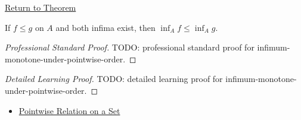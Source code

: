 \newpage
{}
\label{prf:infimum-monotone-under-pointwise-order}

\begin{remark*}[Return]
\hyperref[thm:infimum-monotone-under-pointwise-order]{Return to Theorem}
\end{remark*}

\begin{theorem*}
If \(f\leq g\) on \(A\) and both infima exist, then \(\inf_A f\leq\inf_A g\).
\end{theorem*}

\begin{proof}[Professional Standard Proof]
\LRAProofBodyStart
TODO: professional standard proof for infimum-monotone-under-pointwise-order.
\end{proof}

\begin{proof}[Detailed Learning Proof]
\LRAProofBodyStart
TODO: detailed learning proof for infimum-monotone-under-pointwise-order.
\end{proof}

\begin{remark*}
\end{remark*}

\begin{dependencies}
\begin{itemize}
  \item \hyperref[def:pointwise-relation-on-set]{Pointwise Relation on a Set}
\end{itemize}
\end{dependencies}

\clearpage
